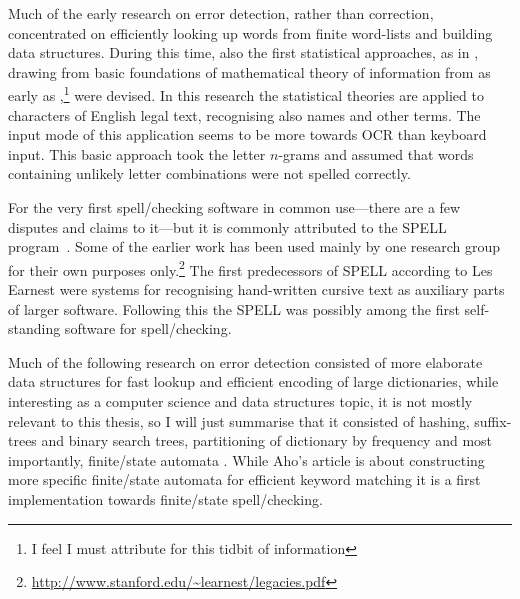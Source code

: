 \documentclass[officiallayout]{unihelcompling}
\begin{document}
Much of the early research on error detection, rather than correction,
concentrated on efficiently looking up words from finite word-lists and
building data structures. During this time, also the first statistical
approaches, as in \citet{raviv1967decision}, drawing from basic foundations of
mathematical theory of information from as early as
\citet{shannon1948mathematical},\footnote{I feel I must attribute
\citet{liberman2012noisily} for this tidbit of information} were devised. In
this research the statistical theories are applied to characters of English
legal text, recognising also names and other terms. The input mode of this
application seems to be more towards OCR than keyboard input. This basic
approach took the letter \(n\)-grams and assumed that words containing unlikely
letter combinations were not spelled correctly.

For the very first spell\-/checking software in common use---there are a few
disputes and claims to it---but it is commonly attributed to the SPELL
program~\citep{gorin1971spell}.  Some of the earlier work has been used mainly
by one research group for their own purposes
only.\footnote{\url{http://www.stanford.edu/~learnest/legacies.pdf}} The first
predecessors of SPELL according to Les Earnest were systems for recognising
hand-written cursive text as auxiliary parts of larger software. Following this
the SPELL was possibly among the first self-standing software for
spell\-/checking.


Much of the following research on error detection consisted of more elaborate
data structures for fast lookup and efficient encoding of large dictionaries,
while interesting as a computer science and data structures topic, it is not
mostly relevant to this thesis, so I will just summarise that it consisted of
hashing, suffix-trees and binary search trees, partitioning of dictionary by
frequency \citep{knuth1973art} and most importantly, finite\-/state automata
\citep{aho1975efficient}. While Aho's article is about constructing more
specific finite\-/state automata for efficient keyword matching it is a first
implementation towards finite\-/state spell\-/checking.
\end{document}
